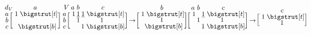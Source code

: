 \documentclass[sn-mathphys]{sn-jnl}
\newcommand\topstrut[1][1.0ex]{\setlength\bigstrutjot{#1}{\bigstrut[t]}}
\newcommand\botstrut[1][0.9ex]{\setlength\bigstrutjot{#1}{\bigstrut[b]}}
\begin{document}
$$
	\def\rowsp{0.4em}
	\def\arraystretch{0.60}
	\makeatletter\setlength\BA@colsep{0.9pt}\makeatother
	\begin{blockarray}{cc}{d_V}
	\kern-0.2em & a \\
		\begin{block}{c[c]}
  		a \kern \rowsp & \; 1 \; \topstrut \\
  		b \kern \rowsp & \;  \; \\
  		c \kern \rowsp & \;  \; \botstrut \\
		\end{block}
	\end{blockarray}
	\; \;
	\begin{blockarray}{cccc}{V}
	 \kern-0.2em & a & b & c  \\
		\begin{block}{c[ccc]}
  		a \kern \rowsp & \; 1 & \underline{1} & \underline{1} \; \topstrut \\
  		b \kern \rowsp & \;  & 1 & 1 \; \\
  		c \kern \rowsp & \;  &  & 1 \; \botstrut \\
		\end{block}
	\end{blockarray}
\; \to
\begin{blockarray}{cc}{}
	\kern-0.2em & b \\
		\begin{block}{c[c]}
  		  & \; 1 \; \topstrut \\
  		 & \;  1 \; \\
  		 & \; \; \botstrut \\
		\end{block}
	\end{blockarray}
	\; \;
\begin{blockarray}{cccc}{}
	\kern-0.2em & a & b & c  \\
		\begin{block}{c[ccc]}
  		  & \; 1 &    & \underline{1} \; \topstrut \\
  		  & \;    & 1 &  1 \; \\
  		 & \;  & &  1 \; \botstrut \\
		\end{block}
	\end{blockarray}
\; \to
	\begin{blockarray}{cc}{}
	\kern-0.2em & c \\
		\begin{block}{c[c]}
  		  & \; 1 \; \topstrut \\
  		 & \; 1 \; \\

\end{block}
\end{blockarray}$$
\end{document}
